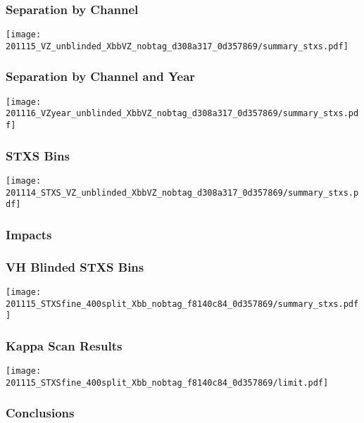\documentclass{beamer}
\newcommand{\beginbackup}{
  \newcounter{framenumbervorappendix}
  \setcounter{framenumbervorappendix}{\value{framenumber}}
}
\newcommand{\backupend}{
  \addtocounter{framenumbervorappendix}{-\value{framenumber}}
  \addtocounter{framenumber}{\value{framenumbervorappendix}}
}
\begin{document}
\begin{frame}
  \frametitle{Separation by Channel}

  \centering
  \texttt{[image: 201115\_VZ\_unblinded\_XbbVZ\_nobtag\_d308a317\_0d357869/summary\_stxs.pdf]}

\end{frame}

\begin{frame}
  \frametitle{Separation by Channel and Year}

  \centering
  \texttt{[image: 201116\_VZyear\_unblinded\_XbbVZ\_nobtag\_d308a317\_0d357869/summary\_stxs.pdf]}

\end{frame}

\begin{frame}
  \frametitle{STXS Bins}

  \centering
  \texttt{[image: 201114\_STXS\_VZ\_unblinded\_XbbVZ\_nobtag\_d308a317\_0d357869/summary\_stxs.pdf]}

\end{frame}

\begin{frame}
  \frametitle{Impacts}

\end{frame}

\begin{frame}
  \frametitle{VH Blinded STXS Bins}

  \centering
  \texttt{[image: 201115\_STXSfine\_400split\_Xbb\_nobtag\_f8140c84\_0d357869/summary\_stxs.pdf]}

\end{frame}

\begin{frame}
  \frametitle{Kappa Scan Results}

  \centering
  \texttt{[image: 201115\_STXSfine\_400split\_Xbb\_nobtag\_f8140c84\_0d357869/limit.pdf]}

\end{frame}

\begin{frame}
  \frametitle{Conclusions}

\end{frame}

\begin{comment}
\beginbackup

\begin{frame}
  \centering
    {\Huge \bf\sffamily Backup Slides}
\end{frame}



\backupend
\end{comment}
\end{document}
